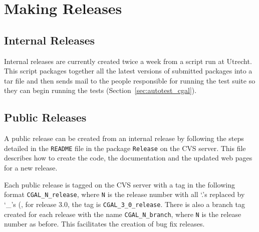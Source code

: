 \chapter{Making Releases}
\label{chap:releases}

\section{Internal Releases}
\label{sec:internal_releases}

Internal releases are currently created twice a week from a script run
at Utrecht.  This script packages together all the latest versions of
submitted packages into a tar file and then sends mail to the people
responsible for running the test suite so they can begin running the
tests (Section~\ref{sec:autotest_cgal}).

\section{Public Releases}
\label{sec:public_releases}

A public release can be created from an internal release by following the
steps detailed in the
\texttt{README} file in the package \texttt{Release} on the CVS server.
This file describes how to create the code, the documentation and the
updated web pages for a new release.

Each public release is tagged on the CVS server with a tag in the following
format \texttt{CGAL\_N\_release}, where \texttt{N} is the release number
with all `.'s replaced by `\_'s (\eg, for release 3.0, the tag is
\texttt{CGAL\_3\_0\_release}.  There is also a branch tag created for
each release with the name \texttt{CGAL\_N\_branch}, where \texttt{N} is
the release number as before.  This facilitates the creation of bug fix
releases.


